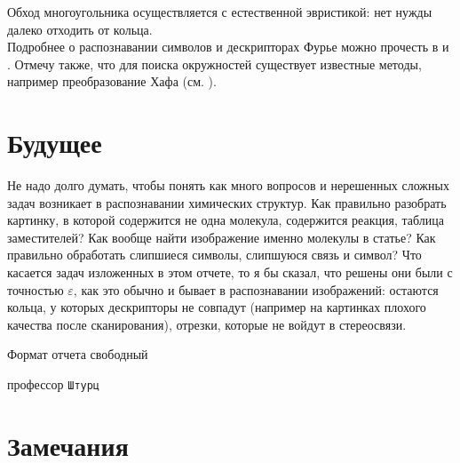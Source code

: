 \noindent
Обход многоугольника осуществляется с естественной эвристикой: нет нужды далеко отходить от кольца. \\ 
\noindent
Подробнее о распознавании символов
и дескрипторах Фурье можно прочесть в \cite{smolov} и \cite{zahn}. Отмечу также, что для поиска окружностей существует известные методы, 
например преобразование Хафа (см. \cite{gonzalez}).

\section*{Будущее}

Не надо долго думать, чтобы понять как много вопросов и нерешенных сложных задач возникает в распознавании химических структур. Как
правильно разобрать картинку, в которой содержится не одна молекула, содержится реакция, таблица заместителей? Как вообще
найти изображение именно молекулы в статье? Как правильно обработать слипшиеся символы, слипшуюся связь и символ? Что касается задач изложенных
в этом отчете, то я бы сказал, что решены они были с точностью $\varepsilon$, как это обычно и бывает в распознавании изображений: остаются
кольца, у которых дескрипторы не совпадут (например на картинках плохого качества после сканирования), отрезки, которые не войдут в стереосвязи.

\onecolumn

\epigraph{Формат отчета свободный}{\tiny{профессор \tt{Штурц}}}

\section*{Замечания}

